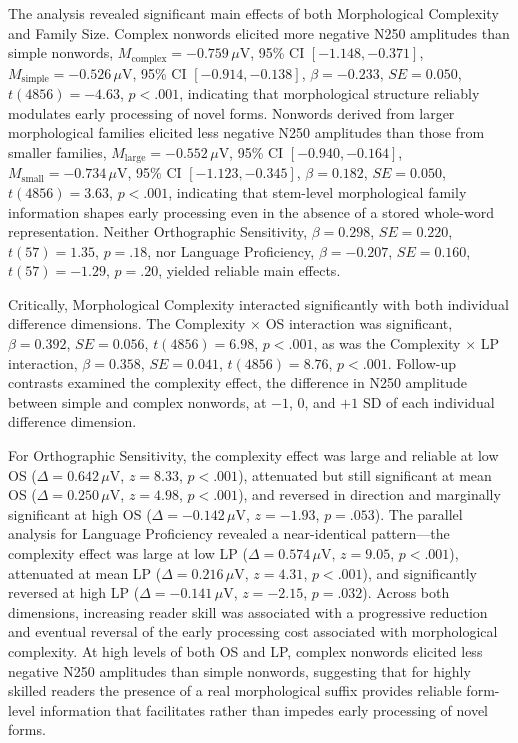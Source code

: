 \documentclass[utf8]{FrontiersinHarvard} %
\begin{document}
The analysis revealed significant main effects of both Morphological Complexity and Family Size. Complex nonwords elicited more negative N250 amplitudes than simple nonwords, $M_{\mathrm{complex}} = -0.759\,\mu$V, 95\% CI $[-1.148, -0.371]$, $M_{\mathrm{simple}} = -0.526\,\mu$V, 95\% CI $[-0.914, -0.138]$, $\beta = -0.233$, $SE = 0.050$, $t(4856) = -4.63$, $p < .001$, indicating that morphological structure reliably modulates early processing of novel forms. Nonwords derived from larger morphological families elicited less negative N250 amplitudes than those from smaller families, $M_{\mathrm{large}} = -0.552\,\mu$V, 95\% CI $[-0.940, -0.164]$, $M_{\mathrm{small}} = -0.734\,\mu$V, 95\% CI $[-1.123, -0.345]$, $\beta = 0.182$, $SE = 0.050$, $t(4856) = 3.63$, $p < .001$, indicating that stem-level morphological family information shapes early processing even in the absence of a stored whole-word representation. Neither Orthographic Sensitivity, $\beta = 0.298$, $SE = 0.220$, $t(57) = 1.35$, $p = .18$, nor Language Proficiency, $\beta = -0.207$, $SE = 0.160$, $t(57) = -1.29$, $p = .20$, yielded reliable main effects.

Critically, Morphological Complexity interacted significantly with both individual difference dimensions. The Complexity $\times$ OS interaction was significant, $\beta = 0.392$, $SE = 0.056$, $t(4856) = 6.98$, $p < .001$, as was the Complexity $\times$ LP interaction, $\beta = 0.358$, $SE = 0.041$, $t(4856) = 8.76$, $p < .001$. Follow-up contrasts examined the complexity effect, the difference in N250 amplitude between simple and complex nonwords, at $-1$, $0$, and $+1$ SD of each individual difference dimension.

For Orthographic Sensitivity, the complexity effect was large and reliable at low OS ($\Delta = 0.642\,\mu$V, $z = 8.33$, $p < .001$), attenuated but still significant at mean OS ($\Delta = 0.250\,\mu$V, $z = 4.98$, $p < .001$), and reversed in direction and marginally significant at high OS ($\Delta = -0.142\,\mu$V, $z = -1.93$, $p = .053$). The parallel analysis for Language Proficiency revealed a near-identical pattern—the complexity effect was large at low LP ($\Delta = 0.574\,\mu$V, $z = 9.05$, $p < .001$), attenuated at mean LP ($\Delta = 0.216\,\mu$V, $z = 4.31$, $p < .001$), and significantly reversed at high LP ($\Delta = -0.141\,\mu$V, $z = -2.15$, $p = .032$). Across both dimensions, increasing reader skill was associated with a progressive reduction and eventual reversal of the early processing cost associated with morphological complexity. At high levels of both OS and LP, complex nonwords elicited less negative N250 amplitudes than simple nonwords, suggesting that for highly skilled readers the presence of a real morphological suffix provides reliable form-level information that facilitates rather than impedes early processing of novel forms.
\end{document}

